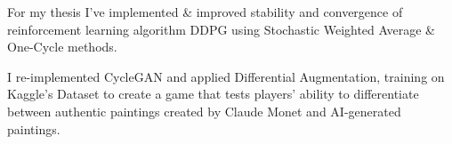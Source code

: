 \documentclass[]{CV}
\begin{document}
\begin{minipage}[t]{0.705\textwidth}
\begin{tightemize}
\item For my thesis I've implemented \& improved stability and convergence of reinforcement learning algorithm DDPG using Stochastic Weighted Average \& One-Cycle methods.

\end{tightemize}

\begin{tightemize}

\item I re-implemented CycleGAN and applied Differential Augmentation, training on Kaggle's Dataset to create a game that tests players' ability to differentiate between authentic paintings created by Claude Monet and AI-generated paintings.

\end{tightemize}
\sectionsep








%
%

\end{minipage} 
\hfill
\end{document}
